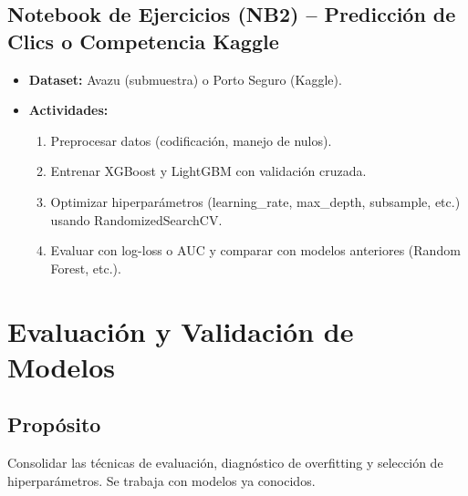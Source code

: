 \documentclass[12pt,a4paper]{article}
\begin{document}
\subsection*{Notebook de Ejercicios (NB2) – Predicción de Clics o Competencia Kaggle}
\begin{itemize}
    \item \textbf{Dataset:} Avazu (submuestra) o Porto Seguro (Kaggle).
    \item \textbf{Actividades:}
    \begin{enumerate}
        \item Preprocesar datos (codificación, manejo de nulos).
        \item Entrenar XGBoost y LightGBM con validación cruzada.
        \item Optimizar hiperparámetros (learning\_rate, max\_depth, subsample, etc.) usando RandomizedSearchCV.
        \item Evaluar con log-loss o AUC y comparar con modelos anteriores (Random Forest, etc.).
    \end{enumerate}
\end{itemize}

\section{Evaluación y Validación de Modelos}
\subsection*{Propósito}
Consolidar las técnicas de evaluación, diagnóstico de overfitting y selección de hiperparámetros. Se trabaja con modelos ya conocidos.
\end{document}
